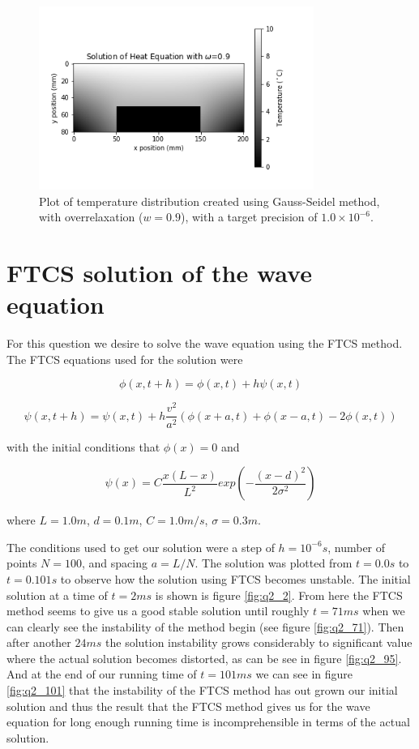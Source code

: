 \documentclass{article}
\begin{document}
\begin{figure}[H]
	\centering
	\includegraphics[width=0.8\textwidth]{../images/q1_c.png}
	\caption{Plot of temperature distribution created using Gauss-Seidel method, with overrelaxation ($w=0.9$), with a target precision of $1.0\times 10^{-6}$.}
	\label{fig:1c}
\end{figure}


\section{FTCS solution of the wave equation}
For this question we desire to solve the wave equation using the FTCS method. The FTCS equations used for the solution were

\begin{equation}
	\phi(x, t+h) = \phi(x,t)+h\psi(x,t)
\end{equation}

\begin{equation}
	\psi(x, t+h) = \psi(x,t)+h\frac{v^2}{a^2}(\phi(x+a,t)+\phi(x-a,t)-2\phi(x,t))
\end{equation}

with the initial conditions that $\phi(x)=0$ and 

\begin{equation}
	\psi(x) = C\frac{x(L-x)}{L^2}exp(-\frac{(x-d)^2}{2\sigma^2})
\end{equation}

where $L=1.0m$, $d=0.1m$, $C=1.0m/s$, $\sigma=0.3m$. 

The conditions used to get our solution were a step of $h=10^{-6}s$, number of points $N=100$, and spacing $a=L/N$. The solution was plotted from $t=0.0s$ to $t=0.101s$ to observe how the solution using FTCS becomes unstable. The initial solution at a time of $t=2ms$ is shown is figure \ref{fig:q2_2}. From here the FTCS method seems to give us a good stable solution until roughly $t=71ms$ when we can clearly see the instability of the method begin (see figure \ref{fig:q2_71}). Then after another $24ms$ the solution instability grows considerably to significant value where the actual solution becomes distorted, as can be see in figure \ref{fig:q2_95}. And at the end of our running time of $t=101ms$ we can see in figure \ref{fig:q2_101} that the instability of the FTCS method has out grown our initial solution and thus the result that the FTCS method gives us for the wave equation for long enough running time is incomprehensible in terms of the actual solution. 
\end{document}

